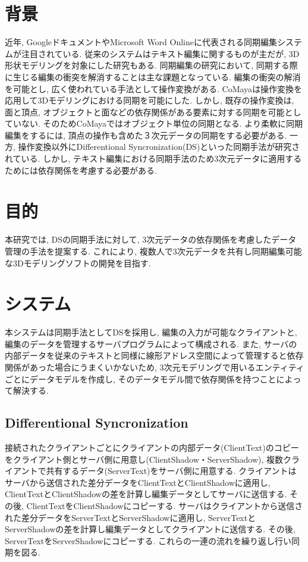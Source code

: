 \documentclass{AIabst}
\begin{document}
\makeAbstHeader
%
%
%
\section{背景}
	近年, GoogleドキュメントやMicrosoft Word Onlineに代表される同期編集システムが注目されている.
	従来のシステムはテキスト編集に関するものが主だが, 3D形状モデリングを対象にした研究もある.
	同期編集の研究において, 同期する際に生じる編集の衝突を解消することは主な課題となっている.
	編集の衝突の解消を可能とし, 広く使われている手法として操作変換がある.
	CoMaya\cite{COMAYA}は操作変換を応用して3Dモデリングにおける同期を可能にした.
	しかし, 既存の操作変換は, 面と頂点, オブジェクトと面などの依存関係がある要素に対する同期を可能としていない.
	そのためCoMayaではオブジェクト単位の同期となる.
	より柔軟に同期編集をするには, 頂点の操作も含めた３次元データの同期をする必要がある.
	一方, 操作変換以外にDifferentional Syncronization(DS)\cite{DS}といった同期手法が研究されている.
	しかし, テキスト編集における同期手法のため3次元データに適用するためには依存関係を考慮する必要がある.

\section{目的}
 本研究では, DSの同期手法に対して, 3次元データの依存関係を考慮したデータ管理の手法を提案する.
  これにより, 複数人で3次元データを共有し同期編集可能な3Dモデリングソフトの開発を目指す.
\section{システム}
 本システムは同期手法としてDSを採用し, 編集の入力が可能なクライアントと, 編集のデータを管理するサーバプログラムによって構成される.
  また, サーバの内部データを従来のテキストと同様に線形アドレス空間によって管理すると依存関係があった場合にうまくいかないため,
  3次元モデリングで用いるエンティティごとにデータモデルを作成し, そのデータモデル間で依存関係を持つことによって解決する.
  \subsection{Differentional Syncronization}
  接続されたクライアントごとにクライアントの内部データ(ClientText)のコピーをクライアント側とサーバ側に用意し(ClientShadow・ServerShadow),
  複数クライアントで共有するデータ(ServerText)をサーバ側に用意する.
  クライアントはサーバから送信された差分データをClientTextとClientShadowに適用し, ClientTextとClientShadowの差を計算し編集データとしてサーバに送信する.
  その後, ClientTextをClientShadowにコピーする.
  サーバはクライアントから送信された差分データをServerTextとServerShadowに適用し, ServerTextとServerShadowの差を計算し編集データとしてクライアントに送信する.
  その後, ServerTextをServerShadowにコピーする.
  これらの一連の流れを繰り返し行い同期を図る.
\end{document}
